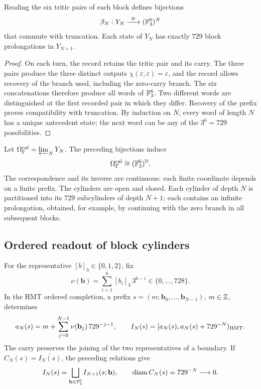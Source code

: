 \begin{proposition}
\label{hmtfg:bloques-729}
Reading the six tritic pairs of each block defines bijections
\[
 \beta_N:Y_N\xrightarrow{\ \cong\ }(\FF_3^6)^N
\]
that commute with truncation. Each state of \(Y_N\) has exactly \(729\) block prolongations in \(Y_{N+1}\).
\end{proposition}
\begin{proof}
On each turn, the record retains the tritic pair and its carry. The three pairs produce the three distinct outputs \(\chi(\varepsilon,\varepsilon)=\varepsilon\), and the record allows recovery of the branch used, including the zero-carry branch. The six concatenations therefore produce all words of \(\mathbb F_3^6\). Two different words are distinguished at the first recorded pair in which they differ. Recovery of the prefix proves compatibility with truncation. By induction on \(N\), every word of length \(N\) has a unique antecedent state; the next word can be any of the \(3^6=729\) possibilities.
\end{proof}

Let \(\Omega_{\Gamma}^{\rm cal}=\varprojlim_NY_N\). The preceding bijections induce
\[
 \Omega_{\Gamma}^{\rm cal}\cong(\mathbb F_3^6)^{\mathbb N}.
\]
The correspondence and its inverse are continuous: each finite coordinate depends on a finite prefix. The cylinders are open and closed. Each cylinder of depth \(N\) is partitioned into its \(729\) subcylinders of depth \(N+1\); each contains an infinite prolongation, obtained, for example, by continuing with the zero branch in all subsequent blocks.



\subsection{Ordered readout of block cylinders}
\label{hmtfg:publicacion-cilindros-bloque}

For the representative \([b]_3\in\{0,1,2\}\), fix
\[
 \nu(\mathbf b)=\sum_{i=1}^6[b_i]_3\,3^{6-i}\in\{0,\ldots,728\}.
\]
In the HMT ordered completion, a prefix
\(s=(m;\mathbf b_0,\ldots,\mathbf b_{N-1})\), \(m\in\mathbb Z\), determines
\[
 a_N(s)=m+\sum_{j=0}^{N-1}\nu(\mathbf b_j)\,729^{-j-1},\qquad
 I_N(s)=[a_N(s),a_N(s)+729^{-N})_{\rm HMT}.
\]
The carry preserves the joining of the two representatives of a boundary. If \(C_N(s)=\overline{I_N(s)}\), the preceding relations give
\[
 I_N(s)=\bigsqcup_{\mathbf b\in\mathbb F_3^6}I_{N+1}(s;\mathbf b),
 \qquad \operatorname{diam}C_N(s)=729^{-N}\longrightarrow0.
\]

